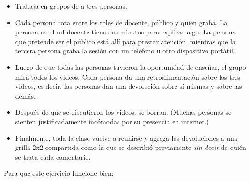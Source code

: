 \begin{itemize}

\item
  Trabaja en grupos de a tres personas.

\item
  Cada persona rota entre los roles de docente, público y quien graba.
  La persona en el rol docente tiene dos minutos para explicar algo.
  La persona que pretende ser el público está allí para prestar atención,
  mientras que la tercera persona graba la sesión con un teléfono u otro dispositivo portátil.

\item
  Luego de que todas las personas tuvieron la oportunidad de enseñar,
  el grupo mira todos los videos.
  Cada persona da una retroalimentación sobre los tres videos,
  es decir, las personas dan una devolución sobre sí mismas y sobre las demás.
 
\item
  Después de que se discutieron los videos,
  se borran.
  (Muchas personas se sienten justificadamente incómodas por su presencia en internet.)

\item
  Finalmente,
  toda la clase vuelve a reunirse
  y agrega las devoluciones a una grilla 2x2 compartida como la que se describió previamente
  \emph{sin decir} de quién se trata cada comentario.

\end{itemize}

Para que este ejercicio funcione bien:

